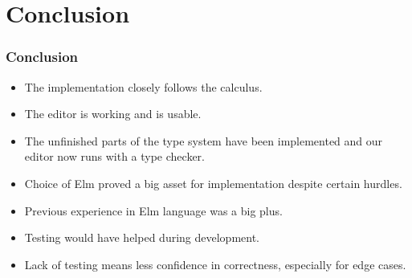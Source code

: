 \section{Conclusion}

\begin{frame}
    \frametitle{Conclusion}
    \begin{itemize}
        \item The implementation closely follows the calculus.
            \pause
        \item The editor is working and is usable.
            \pause
        \item The unfinished parts of the type system have been implemented and our editor now runs with a type checker.
            \pause
        \item Choice of Elm proved a big asset for implementation despite certain hurdles.
            \pause
        \item Previous experience in Elm language was a big plus.
            \pause
        \item Testing would have helped during development.
            \pause
        \item Lack of testing means less confidence in correctness, especially
            for edge cases.
    \end{itemize}
\end{frame}
